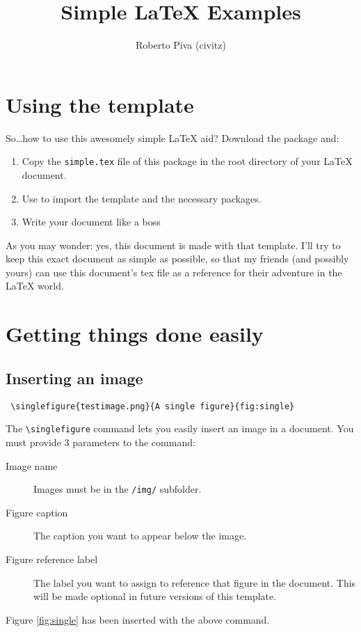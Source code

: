 

\title{Simple \LaTeX{} Examples}
\author{Roberto Piva (civitz)}


\maketitle

\tableofcontents

\section{Using the template}
So\dots how to use this awesomely simple \LaTeX{} aid? Download the package and:
\begin{enumerate}
 \item Copy the \verb!simple.tex! file of this package in the root directory of your \LaTeX{} document. 
 \item Use \verb!! to import the template and the necessary packages.
 \item Write your document like a boss
\end{enumerate}
As you may wonder: yes, this document is made with that template. 
I'll try to keep this exact document as simple as possible, so that my friends (and possibly yours) 
can use this document's tex file as a reference for their adventure in the \LaTeX{} world.
\section{Getting things done easily}
\label{sec:gtde}
\subsection{Inserting an image}
\begin{verbatim}
 \singlefigure{testimage.png}{A single figure}{fig:single}
\end{verbatim}
The \verb!\singlefigure! command lets you easily insert an image in a document.
You must provide 3 parameters to the command: 
\begin{description}
 \item[Image name] 
    Images must be in the \verb!/img/! subfolder.
 \item[Figure caption] 
    The caption you want to appear below the image.
 \item[Figure reference label] 
    The label you want to assign to reference that figure in the document. 
    This will be made optional in future versions of this template.
\end{description}
Figure \ref{fig:single} has been inserted with the above command.

